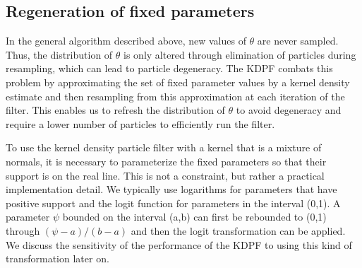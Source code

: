 \documentclass[useAMS,referee,usenatbib]{biom}
\begin{document}
%

\subsection{Regeneration of fixed parameters \label{sec:kd}}

In the general algorithm described above, new values of $\theta$ are never sampled. Thus, the distribution of $\theta$ is only altered through elimination of particles during resampling, which can lead to particle degeneracy. The KDPF combats this problem by approximating the set of fixed parameter values by a kernel density estimate and then resampling from this approximation at each iteration of the filter. This enables us to refresh the distribution of $\theta$ to avoid degeneracy and require a lower number of particles to efficiently run the filter.

To use the kernel density particle filter with a kernel that is a mixture of normals, it is necessary to parameterize the fixed parameters so that their support is on the real line. This is not a constraint, but rather a practical implementation detail. We typically use logarithms for parameters that have positive support and the logit function for parameters in the interval (0,1). A parameter $\psi$ bounded on the interval (a,b) can first be rebounded to (0,1) through $(\psi-a)/(b-a)$ and then the logit transformation can be applied. We discuss the sensitivity of the performance of the KDPF to using this kind of transformation later on. %
\end{document}
